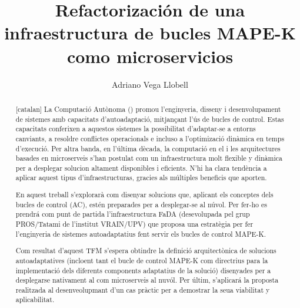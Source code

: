 \documentclass[11pt,spanish,listoffigures,listoftables,listlistings]{\relativepath/tfgetsinf}
\title{Refactorización de una infraestructura de bucles MAPE-K como microservicios}
\author{Adriano Vega Llobell}
\begin{document}



\begin{abstract}[catalan]
  La Computació Autònoma () promou l'enginyeria, disseny i desenvolupament de sistemes amb capacitats d'autoadaptació, mitjançant l'ús de bucles de control. Estas capacitats conferixen a aquestos sistemes la possibilitat d'adaptar-se a entorns canviants, a resoldre conflictes operacionals e incluso a l'optimizació dinàmica en temps d'execució. Per altra banda, en l'última dècada, la computació en el  i les arquitectures basades en microserveis s'han postulat com un infraestructura molt flexible y dinàmica per a desplegar solucion altament disponibles i eficients. N'hi ha clara tendència a aplicar aquest tipus d'infraestructuras, gracies als múltiples beneficis que aporten.

  En aquest treball s'explorarà com disenyar solucions que, aplicant els conceptes dels bucles de control (AC), estén preparades per a desplegar-se al núvol. Per fer-ho es prendrá com punt de partida l'infraestructura FaDA (desevolupada pel grup PROS/Tatami de l'institut VRAIN/UPV) que proposa una estratègia per fer l'enginyeria de sistemes autoadaptatius fent servir els bucles de control MAPE-K.

  Com resultat d'aquest TFM s'espera obtindre la definició arquitectònica de solucions autoadaptatives (incloent tant el bucle de control MAPE-K com directrius para la implementació dels diferents components adaptatius de la solució) disenyades per a desplegarse nativament al com microserveis al nuvól. Per últim, s'aplicará la proposta realitzada al desenveolupmant d'un cas pràctic per a demostrar la seua viabilitat y aplicabilitat.
\end{abstract}
\end{document}
